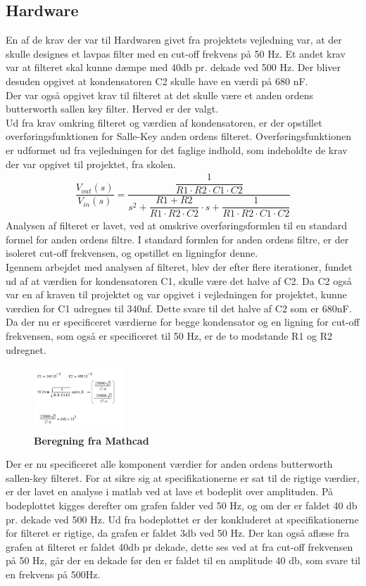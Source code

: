 \subsection{Hardware}
En af de krav der var til Hardwaren givet fra projektets vejledning var, at der skulle designes et lavpas filter med en cut-off frekvens på 50 Hz. Et andet krav var at filteret skal kunne dæmpe med 40db pr. dekade ved 500 Hz. Der bliver desuden opgivet at kondensatoren C2 skulle have en værdi på 680 nF. \\
Der var også opgivet krav til filteret at det skulle være et anden ordens butterworth sallen key filter. Herved er der valgt. \\
Ud fra krav omkring filteret og værdien af kondensatoren, er der opstillet overføringsfunktionen for Salle-Key anden ordens filteret. Overføringsfunktionen er udformet ud fra vejledningen for det faglige indhold, som indeholdte de krav der var opgivet til projektet, fra skolen.
\begin{align}
\dfrac{V_{out}(s)}{V_{in}(s)}=\dfrac{\dfrac{1}{R1\cdot R2\cdot C1\cdot C2}}{s^2+\dfrac{R1+R2}{R1\cdot R2\cdot C2}\cdot s+\dfrac{1}{R1\cdot R2\cdot C1\cdot C2}}
\end{align}
Analysen af filteret er lavet, ved at omskrive overføringsformlen til en standard formel for anden ordens filtre. I standard formlen for anden ordens filtre, er der isoleret cut-off frekvensen, og opstillet en ligningfor denne. \\
Igennem arbejdet med analysen af filteret, blev der efter flere iterationer, fundet ud af at værdien for kondensatoren C1, skulle være det halve af C2. Da C2 også var en af kraven til projektet og var opgivet i vejledningen for projektet, kunne værdien for C1 udregnes til 340nf. Dette svare til det halve af C2 som er 680nF.\\
Da der nu er specificeret værdierne for begge kondensator og en ligning for cut-off frekvensen, som også er specificeret til 50 Hz, er de to modstande R1 og R2 udregnet. 
\begin{figure}[H]
\includegraphics[width =0.3\textwidth , center]{billeder/mathcad2}
\caption{\textbf{Beregning fra Mathcad}}
\end{figure}
Der er nu specificeret alle komponent værdier for anden ordens butterworth sallen-key filteret. For at sikre sig at specifikationerne er sat til de rigtige værdier, er der lavet en analyse i matlab ved at lave et bodeplit over amplituden. På bodeplottet kigges derefter om grafen falder ved 50 Hz, og om der er faldet 40 db pr. dekade ved 500 Hz. Ud fra bodeplottet er der konkluderet at specifikationerne for filteret er rigtige, da grafen er faldet 3db ved 50 Hz. Der kan også aflæse fra grafen at filteret er faldet 40db pr dekade, dette ses ved at fra cut-off frekvensen på 50 Hz, går der en dekade før den er faldet til en amplitude 40 db, som svare til en frekvens på 500Hz. 
